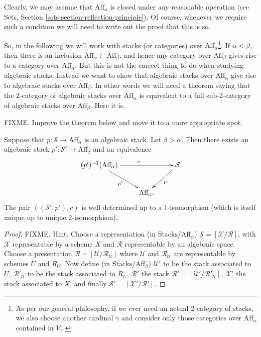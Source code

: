 \noindent
Clearly, we may assume that $\text{Aff}_\alpha$ is closed under any reasonable
operation (see Sets, Section \ref{sets-section-reflection-principle}).
Of course, whenever we require such a condition we will need to write out
the proof that this is so.

\medskip\noindent
So, in the following we will work with stacks (or categories) over
$\text{Aff}_\alpha$\footnote{As per our general philosophy, if we ever need
an actual 2-category of stacks, we also choose another cardinal $\gamma$ and
consider only those categories over $\text{Aff}_\alpha$ contained in
$V_\gamma$.}. If $\alpha < \beta$, then there is an inclusion
$\text{Aff}_\alpha \subset \text{Aff}_\beta$, and hence any category
over $\text{Aff}_\beta$ gives rise to a category over $\text{Aff}_\alpha$.
But this is not the correct thing to do when studying algebraic stacks.
Instead we want to show that algebraic stacks over $\text{Aff}_\alpha$
give rise to algebraic stacks over $\text{Aff}_\beta$. In other words we will
need a theorem saying that the 2-category of algebraic
stacks over $\text{Aff}_\alpha$ is equivalent to a full sub-2-category of
algebraic stacks over $\text{Aff}_\beta$. Here it is.

\medskip\noindent
FIXME. Improve the theorem below and move it to a more appropriate spot.

\begin{theorem}
\label{theorem-change-alpha}
Suppose that $p : \mathcal{S} \to \text{Aff}_\alpha$ is an algebraic stack.
Let $\beta > \alpha$. Then there exists an algebraic stack
$p' : \mathcal{S}' \to \text{Aff}_\beta$ and an equivalence
$$
\xymatrix{
(p')^{-1}(\text{Aff}_\alpha) \ar[rd]_{p'} \ar[rr]^c && \mathcal{S}\ar[ld]^p\\
&\text{Aff}_\alpha.&}
$$
The pair $((\mathcal{S'},p'),c)$ is well determined up to a 1-isomorphism
(which is itself unique up to unique 2-isomorphism).
\end{theorem}

\begin{proof}
FIXME. Hint. Choose a representation (in $\text{Stacks}/\text{Aff}_\alpha$)
$\mathcal{S} = [ \mathcal{X}/\mathcal{R} ]$, with $\mathcal{X}$ representable
by a scheme $X$ and $\mathcal{R}$ representable by an algebraic space.
Choose a presentation $\mathcal{R} = [ \mathcal{U}/\mathcal{R}_\mathcal{U} ]$
where $\mathcal{U}$ and $\mathcal{R}_\mathcal{U}$ are representable
by schemes $U$ and $R_U$. Now define (in $\text{Stacks}/\text{Aff}_\beta$)
$\mathcal{U}'$ to be the stack associated to $U$, $\mathcal{R}'_\mathcal{U}$
to be the stack associated to $R_U$, $\mathcal{R}'$ the stack
$\mathcal{R}' = [ \mathcal{U}'/\mathcal{R}'_\mathcal{U} ]$, $\mathcal{X}'$
the stack associated to $X$, and finally
$\mathcal{S}' = [ \mathcal{X}'/\mathcal{R}' ]$.
\end{proof}

